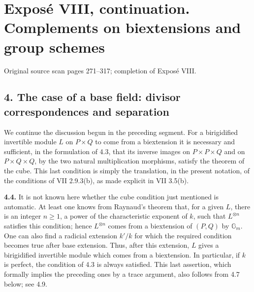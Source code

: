 \documentclass[11pt]{article}
\providecommand{\Spec}{\operatorname{Spec}}
\providecommand{\Pic}{\operatorname{Pic}}
\providecommand{\Ker}{\operatorname{Ker}}
\providecommand{\Gm}{\mathbb G_m}
\providecommand{\Hom}{\operatorname{Hom}}
\providecommand{\Ext}{\operatorname{Ext}}
\providecommand{\id}{\operatorname{id}}
\begin{document}
\providecommand{\cG}{\mathcal G}
\providecommand{\cD}{\mathcal D}
\providecommand{\cF}{\mathcal F}
\providecommand{\cL}{\mathcal L}
\providecommand{\cM}{\mathcal M}
\providecommand{\cN}{\mathcal N}
\providecommand{\Gm}{\mathbb G_m}
\providecommand{\Ga}{\mathbb G_a}
\providecommand{\ZZ}{\mathbb Z}
\providecommand{\QQ}{\mathbb Q}
\providecommand{\Pic}{\operatorname{Pic}}
\providecommand{\Biext}{\operatorname{Biext}}
\providecommand{\Ext}{\operatorname{Ext}}
\providecommand{\Hom}{\operatorname{Hom}}
\providecommand{\Ker}{\operatorname{Ker}}
\providecommand{\Spec}{\operatorname{Spec}}
\providecommand{\supp}{\operatorname{supp}}
\providecommand{\Div}{\operatorname{Div}}
\providecommand{\NS}{\operatorname{NS}}
\providecommand{\Tate}{\operatorname{T}}
\providecommand{\Tr}{\operatorname{Tr}}
\providecommand{\codim}{\operatorname{codim}}
\providecommand{\im}{\operatorname{Im}}
\providecommand{\id}{\mathrm{id}}
\providecommand{\Sym}{\operatorname{Sym}}
\providecommand{\disc}{\operatorname{disc}}


\section*{Exposé VIII, continuation. Complements on biextensions and group schemes}
\begin{center}
Original source scan pages 271--317; completion of Exposé VIII.
\end{center}

\subsection*{4. The case of a base field: divisor correspondences and separation}

We continue the discussion begun in the preceding segment.  For a birigidified invertible module \(L\) on \(P\times Q\) to come from a biextension it is necessary and sufficient, in the formulation of 4.3, that its inverse images on \(P\times P\times Q\) and on \(P\times Q\times Q\), by the two natural multiplication morphisms, satisfy the theorem of the cube.  This last condition is simply the translation, in the present notation, of the conditions of VII 2.9.3(b), as made explicit in VII 3.5(b).

\textbf{4.4.}  It is not known here whether the cube condition just mentioned is automatic.  At least one knows from Raynaud's theorem that, for a given \(L\), there is an integer \(n\geq 1\), a power of the characteristic exponent of \(k\), such that \(L^{\otimes n}\) satisfies this condition; hence \(L^{\otimes n}\) comes from a biextension of \((P,Q)\) by \(\Gm\).  One can also find a radicial extension \(k'/k\) for which the required condition becomes true after base extension.  Thus, after this extension, \(L\) gives a birigidified invertible module which comes from a biextension.  In particular, if \(k\) is perfect, the condition of 4.3 is always satisfied.  This last assertion, which formally implies the preceding ones by a trace argument, also follows from 4.7 below; see 4.9.
\end{document}
